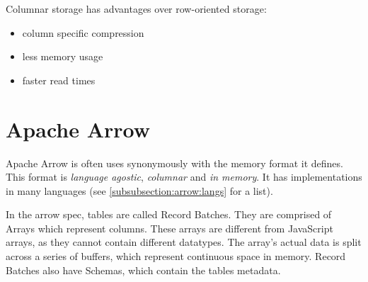 Columnar storage has advantages over row-oriented storage:
\begin{itemize}
	\item column specific compression \autocite{Abadi2013}
	\item less memory usage \autocite{Abadi2013}
	\item faster read times \autocite{Floratou2019}
\end{itemize}


\section{Apache Arrow}
\label{section:arrow}

Apache Arrow is often uses synonymously with the memory format it defines.
This format is \emph{language agostic}, \emph{columnar} and \emph{in memory}.
It has implementations in many languages (see \ref{subsubsection:arrow:langs} for a list).

In the arrow spec, tables are called Record Batches. They are comprised of Arrays which represent columns.
These arrays are different from JavaScript arrays, as they cannot contain different datatypes.
The array's actual data is split across a series of buffers, which represent continuous space in memory.
Record Batches also have Schemas, which contain the tables metadata.

